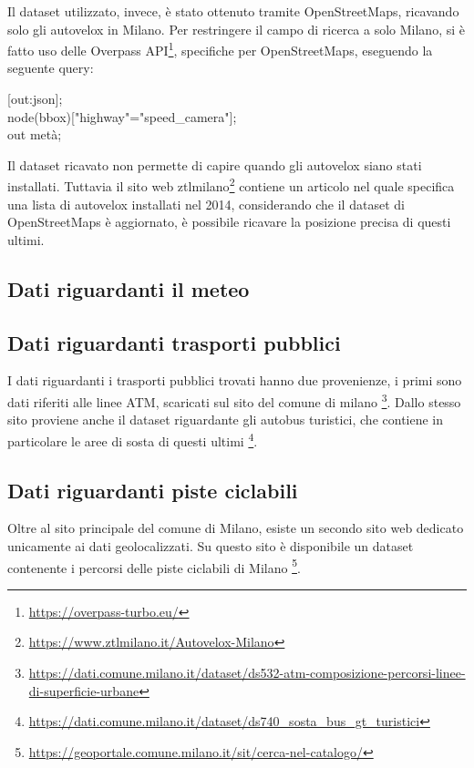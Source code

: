 \documentclass[a4paper]{report}
\begin{document}
Il dataset utilizzato, invece, è stato ottenuto tramite OpenStreetMaps, ricavando solo gli autovelox 
in Milano. 
Per restringere il campo di ricerca a solo Milano, si è fatto uso delle Overpass API\footnote{\url{https://overpass-turbo.eu/}}, 
specifiche per OpenStreetMaps, eseguendo la seguente query: 

[out:json];\\
node({{bbox}})["highway"="speed\_camera"];\\
out metà;

Il dataset ricavato non permette di capire quando gli autovelox siano stati installati.
Tuttavia il sito web ztlmilano\footnote{\url{https://www.ztlmilano.it/Autovelox-Milano}} 
contiene un articolo nel quale specifica una lista di 
autovelox installati nel 2014, considerando che il dataset di OpenStreetMaps è aggiornato, 
è possibile ricavare la posizione precisa di questi ultimi.

\subsection{Dati riguardanti il meteo}

\subsection{Dati riguardanti trasporti pubblici}
I dati riguardanti i trasporti pubblici trovati hanno due provenienze, i primi sono 
dati riferiti alle linee ATM, scaricati sul sito del comune di milano
\footnote{\url{https://dati.comune.milano.it/dataset/ds532-atm-composizione-percorsi-linee-di-superficie-urbane}}.
Dallo stesso sito proviene anche il dataset riguardante gli autobus turistici, che 
contiene in particolare le aree di sosta di questi ultimi
\footnote{\url{https://dati.comune.milano.it/dataset/ds740_sosta_bus_gt_turistici}}.

\subsection{Dati riguardanti piste ciclabili}
Oltre al sito principale del comune di Milano, esiste un secondo sito web dedicato 
unicamente ai dati geolocalizzati. Su questo sito è disponibile un dataset contenente 
i percorsi delle piste ciclabili di Milano
\footnote{\url{https://geoportale.comune.milano.it/sit/cerca-nel-catalogo/}}.
\end{document}

